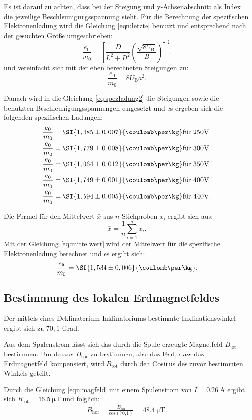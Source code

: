 Es ist darauf zu achten, dass bei der Steigung und y-Achsenabschnitt als Index die jeweilige Beschleunigungsspannung steht. Für die Berechnung der spezifischen Elektronenladung wird die Gleichung \ref{eqn:letzte} benutzt und entsprechend nach der gesuchten Größe umgeschrieben:
\begin{equation}
\label{eq:spezladung}
 \frac{e_0}{m_0} =  \left[\frac{D}{L^2+D^2}\left(\frac{\sqrt{8U_\text{B}}}{B}\right)\right]^2.
\end{equation}
und vereinfacht sich mit der eben berechneten Steigungen zu:
\begin{equation}
\label{eq:spezladung2}
\frac{e_0}{m_0} = 8U_\text{B} a^2.
\end{equation}

Danach wird in die Gleichung \ref{eq:spezladung2} die Steigungen sowie die benutzten Beschleunigungsspannungen eingesetzt und es ergeben sich die folgenden spezifischen Ladungen:
\begin{align*}
\frac{e_0}{m_0} &= \SI{1,485 \pm 0,007}{\coulomb\per\kg} \text{für 250V} \\
\frac{e_0}{m_0} &= \SI{1,779 \pm 0,008}{\coulomb\per\kg} \text{für 300V} \\
\frac{e_0}{m_0} &= \SI{1,064 \pm 0,012}{\coulomb\per\kg} \text{für 350V} \\
\frac{e_0}{m_0} &= \SI{1,749 \pm 0,001}{\coulomb\per\kg} \text{für 400V} \\
\frac{e_0}{m_0} &= \SI{1,594 \pm 0,005}{\coulomb\per\kg} \text{für 440V}.
\end{align*}

Die Formel für den Mittelwert $\bar{x}$ aus $n$ Stichproben $x_{i}$ ergibt sich aus:
\begin{equation}
\bar{x}=\frac{1}{n}\sum \limits_{i=1}^n x_{i}.
\label{eq:mittelwert}
\end{equation}
Mit der Gleichung \ref{eq:mittelwert} wird der Mittelwert für die spezifische Elektronenladung berechnet und es ergibt sich:
\begin{equation}
\label{eq:mittelwertspez}
\frac{e_0}{m_0} = \SI{1,534 \pm 0,006}{\coulomb\per\kg}.
\end{equation}

\subsection{Bestimmung des lokalen Erdmagnetfeldes}
Der mittels eines Deklinatorium-Inklinatoriums bestimmte Inklinationswinkel ergibt sich zu $70,1$ Grad. 

Aus dem Spulenstrom lässt sich das durch die Spule erzeugte Magnetfeld $B_{\text{tot}}$ bestimmen. Um daraus $B_{\text{hor}}$ zu bestimmen, also das Feld, dass das Erdmagnetfeld kompensiert, wird $B_{\text{tot}}$ durch den Cosinus des zuvor bestimmten Winkels geteilt. 

Durch die Gleichung \ref{eqn:magfeld} mit einem Spulenstrom von $I=\SI{0,26}{\ampere}$ ergibt sich $B_{\text{tot}}=\SI{16,5}{\micro\tesla}$ und folglich:
\begin{align*}
B_{\text{hor}} = \frac{B_{\text{tot}}}{\text{cos}(70,1)}=\SI{48,4}{\micro\tesla}.
\end{align*}

